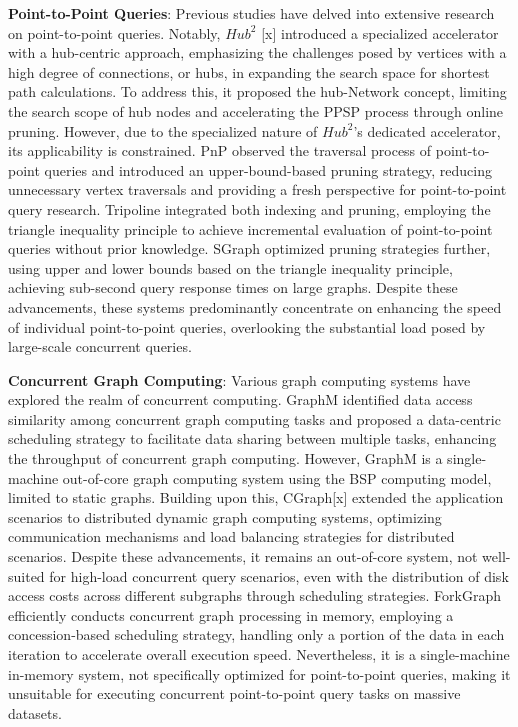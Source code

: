 \documentclass[lettersize,journal]{IEEEtran} %
\begin{document}
{\bf{Point-to-Point Queries}}: Previous studies have delved into extensive research on point-to-point queries. Notably, $Hub^2$ [x] introduced a specialized accelerator with a hub-centric approach, emphasizing the challenges posed by vertices with a high degree of connections, or hubs, in expanding the search space for shortest path calculations. To address this, it proposed the hub-Network concept, limiting the search scope of hub nodes and accelerating the PPSP process through online pruning. However, due to the specialized nature of $Hub^2$'s dedicated accelerator, its applicability is constrained. PnP observed the traversal process of point-to-point queries and introduced an upper-bound-based pruning strategy, reducing unnecessary vertex traversals and providing a fresh perspective for point-to-point query research. Tripoline integrated both indexing and pruning, employing the triangle inequality principle to achieve incremental evaluation of point-to-point queries without prior knowledge. SGraph optimized pruning strategies further, using upper and lower bounds based on the triangle inequality principle, achieving sub-second query response times on large graphs. Despite these advancements, these systems predominantly concentrate on enhancing the speed of individual point-to-point queries, overlooking the substantial load posed by large-scale concurrent queries.

{\bf{Concurrent Graph Computing}}: Various graph computing systems have explored the realm of concurrent computing. GraphM identified data access similarity among concurrent graph computing tasks and proposed a data-centric scheduling strategy to facilitate data sharing between multiple tasks, enhancing the throughput of concurrent graph computing. However, GraphM is a single-machine out-of-core graph computing system using the BSP computing model, limited to static graphs. Building upon this, CGraph[x] extended the application scenarios to distributed dynamic graph computing systems, optimizing communication mechanisms and load balancing strategies for distributed scenarios. Despite these advancements, it remains an out-of-core system, not well-suited for high-load concurrent query scenarios, even with the distribution of disk access costs across different subgraphs through scheduling strategies. ForkGraph efficiently conducts concurrent graph processing in memory, employing a concession-based scheduling strategy, handling only a portion of the data in each iteration to accelerate overall execution speed. Nevertheless, it is a single-machine in-memory system, not specifically optimized for point-to-point queries, making it unsuitable for executing concurrent point-to-point query tasks on massive datasets.
\end{document}
